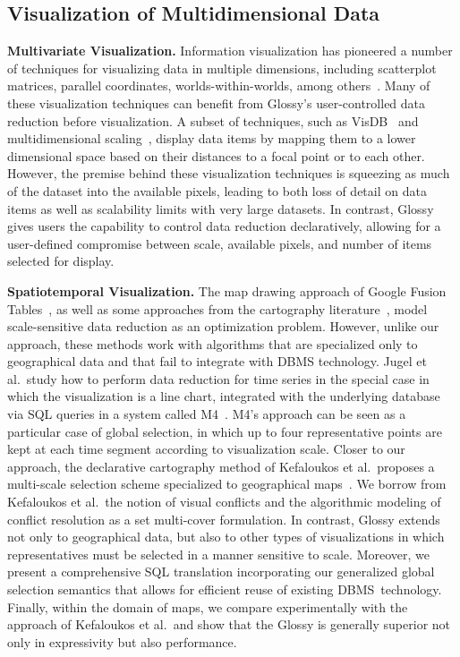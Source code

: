 \documentclass[11pt, oneside]{report}
\newcommand{\minisec}[1]{\noindent\textbf{#1.}}
\begin{document}
{\subsection{Visualization of Multidimensional Data}
\label{sec:related:multidimensional}

\minisec{Multivariate Visualization}
Information visualization has pioneered a number of techniques for visualizing data in multiple dimensions, including scatterplot matrices, parallel coordinates, worlds-within-worlds, among others~\cite{CardMacS99:InfoVizBook,WongB94:InfoVizSurvey}. Many of these visualization techniques can benefit from Glossy's user-controlled data reduction before visualization. A subset of techniques, such as VisDB~\cite{KeimK95:VisDB} and multidimensional scaling~\cite{KruskalW78:MDS}, display data items by mapping them to a lower dimensional space based on their distances to a focal point or to each other. However, the premise behind these visualization techniques is squeezing as much of the dataset into the available pixels, leading to both loss of detail on data items as well as scalability limits with very large datasets. In contrast, Glossy gives users the capability to control data reduction declaratively, allowing for a user-defined compromise between scale, available pixels, and number of items selected for display.   

\minisec{Spatiotemporal Visualization}
The map drawing approach of Google Fusion Tables~\cite{DasSarmaLGMH12:FusionTables}, as well as some approaches from the cartography literature~\cite{NeunBW09:GeneralizationWeb,WareJT03:GeneralizationMeta}, model scale-sensitive data reduction as an optimization problem. However, unlike our approach, these methods work with algorithms that are specialized only to geographical data and that fail to integrate with DBMS technology. Jugel et al.~study how to perform data reduction for time series in the special case in which the visualization is a line chart, integrated with the underlying database via SQL queries in a system called M4~\cite{jugel:m4}. M4's approach can be seen as a particular case of global selection, in which up to four representative points are kept at each time segment according to visualization scale. Closer to our approach, the declarative cartography method of Kefaloukos et al.~proposes a multi-scale selection scheme specialized to geographical maps~\cite{KefaloukosSZ14:CVL}. We borrow from Kefaloukos et al.~the notion of visual conflicts and the algorithmic modeling of conflict resolution as a set multi-cover formulation. In contrast, Glossy extends not only to geographical data, but also to other types of visualizations in which representatives must be selected in a manner sensitive to scale. Moreover, we present a comprehensive SQL translation incorporating our generalized global selection semantics that allows for efficient reuse of existing DBMS~technology. Finally, within the domain of maps, we compare experimentally with the approach of Kefaloukos et al.~and show that the Glossy is generally superior not only in expressivity but also performance.    

}
\end{document}
